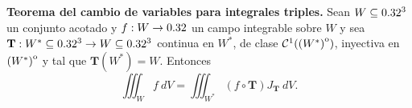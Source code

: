 \begin{theorem}
    \textbf{Teorema del cambio de variables para integrales triples.}  Sean $W \subseteq0.32^3$ un conjunto acotado y  $f:W \to0.32$ un campo integrable sobre $W$ y sea $\mathbf{T}:W^*\subseteq0.32^3\to W\subseteq0.32^3$ continua en $W^*$, de clase $\mathcal{C}^1({\kern0pt(W^*)}^{\mathrm{o}})$,  inyectiva en ${\kern0pt(W^*)}^{\mathrm{o}}$ y tal que $\mathbf{T}(W^*)=W$.  Entonces
    \[
        \iiint_W f\:dV=\iiint_{W^*}(f\circ\mathbf{T})J_\mathbf{T}\:dV.
    \]
\end{theorem}







